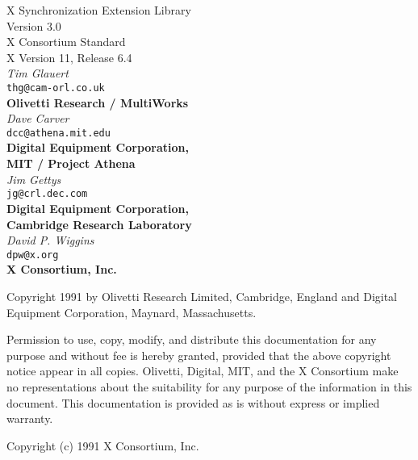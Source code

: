 \begin{center}

{\large X Synchronization Extension Library}\\[10pt]
{\large Version 3.0}\\[15pt]
{\large X Consortium Standard}\\[15pt]
{\large X Version 11, Release 6.4}\\[15pt]
{\it Tim Glauert}\\[0pt]
{\tt thg@cam-orl.co.uk}\\[0pt]
{\bf Olivetti Research / MultiWorks}\\[5pt]
{\it Dave Carver}\\[0pt]
{\tt dcc@athena.mit.edu}\\[0pt]
{\bf Digital Equipment Corporation,}\\[0pt]
{\bf MIT / Project Athena}\\[5pt]
{\it Jim Gettys}\\[0pt]
{\tt jg@crl.dec.com}\\[0pt]
{\bf Digital Equipment Corporation,}\\[0pt]
{\bf Cambridge Research Laboratory}\\[5pt]
{\it David P. Wiggins}\\[0pt]
{\tt dpw@x.org}\\[0pt]
{\bf X Consortium, Inc.}\\[0pt]

\end {center}

Copyright 1991 by Olivetti Research Limited, Cambridge, England and
Digital Equipment Corporation, Maynard, Massachusetts.

{\small Permission to use, copy, modify, and distribute this documentation
for any purpose and without fee is hereby granted, provided that the above
copyright notice appear in all copies. Olivetti, Digital, MIT, and the
X Consortium
make no representations about the suitability for any purpose of the
information in this document. This documentation is provided as is without
express or implied warranty.}

Copyright (c) 1991 X Consortium, Inc.

